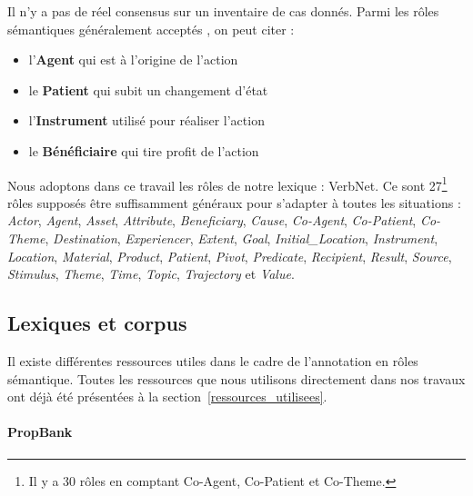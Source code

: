 Il n'y a pas de réel consensus sur un inventaire de cas donnés. Parmi les rôles
sémantiques généralement acceptés \citep[p.~4]{palmer2010semantic}, on peut
citer :

\begin{itemize}
    \item l'\textbf{Agent} qui est à l'origine de l'action
    \item le \textbf{Patient} qui subit un changement d'état
    \item l'\textbf{Instrument} utilisé pour réaliser l'action
    \item le \textbf{Bénéficiaire} qui tire profit de l'action
\end{itemize}

Nous adoptons dans ce travail les rôles de notre lexique : VerbNet. Ce sont
27\footnote{Il y a 30 rôles en comptant Co-Agent, Co-Patient et Co-Theme.}
rôles supposés être suffisamment généraux pour s'adapter à toutes les
situations : \textit{Actor}, \textit{Agent}, \textit{Asset},
\textit{Attribute}, \textit{Beneficiary}, \textit{Cause}, \textit{Co-Agent},
\textit{Co-Patient}, \textit{Co-Theme}, \textit{Destination},
\textit{Experiencer}, \textit{Extent}, \textit{Goal},
\textit{Initial\_Location}, \textit{Instrument}, \textit{Location},
\textit{Material}, \textit{Product}, \textit{Patient}, \textit{Pivot},
\textit{Predicate}, \textit{Recipient}, \textit{Result}, \textit{Source},
\textit{Stimulus}, \textit{Theme}, \textit{Time}, \textit{Topic},
\textit{Trajectory} et \textit{Value}.

\subsection{Lexiques et corpus}
\label{ressources_non_utilisees}

Il existe différentes ressources utiles dans le cadre de l'annotation en rôles
sémantique. Toutes les ressources que nous utilisons directement dans nos
travaux ont déjà été présentées à la section~\ref{ressources_utilisees}.

\paragraph{PropBank}

